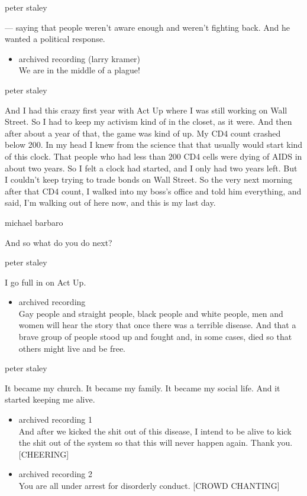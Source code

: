 peter staley

--- saying that people weren't aware enough and weren't fighting back.
And he wanted a political response.

\begin{itemize}
\tightlist
\item
  archived recording (larry kramer)\\
  We are in the middle of a plague!
\end{itemize}

peter staley

And I had this crazy first year with Act Up where I was still working on
Wall Street. So I had to keep my activism kind of in the closet, as it
were. And then after about a year of that, the game was kind of up. My
CD4 count crashed below 200. In my head I knew from the science that
that usually would start kind of this clock. That people who had less
than 200 CD4 cells were dying of AIDS in about two years. So I felt a
clock had started, and I only had two years left. But I couldn't keep
trying to trade bonds on Wall Street. So the very next morning after
that CD4 count, I walked into my boss's office and told him everything,
and said, I'm walking out of here now, and this is my last day.

michael barbaro

And so what do you do next?

peter staley

I go full in on Act Up.

\begin{itemize}
\tightlist
\item
  archived recording\\
  Gay people and straight people, black people and white people, men and
  women will hear the story that once there was a terrible disease. And
  that a brave group of people stood up and fought and, in some cases,
  died so that others might live and be free.
\end{itemize}

peter staley

It became my church. It became my family. It became my social life. And
it started keeping me alive.

\begin{itemize}
\item
  archived recording 1\\
  And after we kicked the shit out of this disease, I intend to be alive
  to kick the shit out of the system so that this will never happen
  again. Thank you. {[}CHEERING{]}
\item
  archived recording 2\\
  You are all under arrest for disorderly conduct. {[}CROWD CHANTING{]}
\end{itemize}

